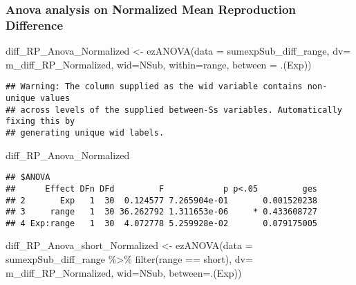 \documentclass[
]{article}
\newenvironment{Shaded}{\begin{snugshade}}{\end{snugshade}}
\newcommand{\AttributeTok}[1]{\textcolor[rgb]{0.77,0.63,0.00}{#1}}
\newcommand{\FunctionTok}[1]{\textcolor[rgb]{0.00,0.00,0.00}{#1}}
\newcommand{\NormalTok}[1]{#1}
\newcommand{\OtherTok}[1]{\textcolor[rgb]{0.56,0.35,0.01}{#1}}
\newcommand{\SpecialCharTok}[1]{\textcolor[rgb]{0.00,0.00,0.00}{#1}}
\newcommand{\StringTok}[1]{\textcolor[rgb]{0.31,0.60,0.02}{#1}}
\begin{document}
\hypertarget{anova-analysis-on-normalized-mean-reproduction-difference}{%
\subsubsection{Anova analysis on Normalized Mean Reproduction
Difference}\label{anova-analysis-on-normalized-mean-reproduction-difference}}

\begin{Shaded}
\begin{Highlighting}[]
\NormalTok{diff\_RP\_Anova\_Normalized }\OtherTok{\textless{}{-}} \FunctionTok{ezANOVA}\NormalTok{(}\AttributeTok{data =}\NormalTok{ sumexpSub\_diff\_range, }\AttributeTok{dv=}\NormalTok{ m\_diff\_RP\_Normalized, }\AttributeTok{wid=}\NormalTok{NSub, }\AttributeTok{within=}\NormalTok{range,  }\AttributeTok{between =}\NormalTok{ .(Exp))}
\end{Highlighting}
\end{Shaded}

\begin{verbatim}
## Warning: The column supplied as the wid variable contains non-unique values
## across levels of the supplied between-Ss variables. Automatically fixing this by
## generating unique wid labels.
\end{verbatim}

\begin{Shaded}
\begin{Highlighting}[]
\NormalTok{diff\_RP\_Anova\_Normalized}
\end{Highlighting}
\end{Shaded}

\begin{verbatim}
## $ANOVA
##      Effect DFn DFd         F            p p<.05         ges
## 2       Exp   1  30  0.124577 7.265904e-01       0.001520238
## 3     range   1  30 36.262792 1.311653e-06     * 0.433608727
## 4 Exp:range   1  30  4.072778 5.259928e-02       0.079175005
\end{verbatim}

\begin{Shaded}
\begin{Highlighting}[]
\NormalTok{diff\_RP\_Anova\_short\_Normalized }\OtherTok{\textless{}{-}} \FunctionTok{ezANOVA}\NormalTok{(}\AttributeTok{data =}\NormalTok{ sumexpSub\_diff\_range }\SpecialCharTok{\%\textgreater{}\%} \FunctionTok{filter}\NormalTok{(range }\SpecialCharTok{==} \StringTok{\textquotesingle{}short\textquotesingle{}}\NormalTok{), }\AttributeTok{dv=}\NormalTok{ m\_diff\_RP\_Normalized, }\AttributeTok{wid=}\NormalTok{NSub, }\AttributeTok{between=}\NormalTok{.(Exp))}
\end{Highlighting}
\end{Shaded}
\end{document}
